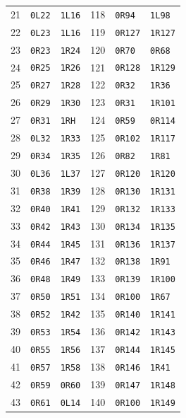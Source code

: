 \begin{longtable}{@{}rll@{\qquad\qquad}rll@{}}
21 & \texttt{0L22} & \texttt{1L16} & 118 & \texttt{0R94} & \texttt{1L98}\\
22 & \texttt{0L23} & \texttt{1L16} & 119 & \texttt{0R127} & \texttt{1R127}\\
23 & \texttt{0R23} & \texttt{1R24} & 120 & \texttt{0R70} & \texttt{0R68}\\
24 & \texttt{0R25} & \texttt{1R26} & 121 & \texttt{0R128} & \texttt{1R129}\\
25 & \texttt{0R27} & \texttt{1R28} & 122 & \texttt{0R32} & \texttt{1R36}\\
26 & \texttt{0R29} & \texttt{1R30} & 123 & \texttt{0R31} & \texttt{1R101}\\
27 & \texttt{0R31} & \texttt{1RH} & 124 & \texttt{0R59} & \texttt{0R114}\\
28 & \texttt{0L32} & \texttt{1R33} & 125 & \texttt{0R102} & \texttt{1R117}\\
29 & \texttt{0R34} & \texttt{1R35} & 126 & \texttt{0R82} & \texttt{1R81}\\
30 & \texttt{0L36} & \texttt{1L37} & 127 & \texttt{0R120} & \texttt{1R120}\\
31 & \texttt{0R38} & \texttt{1R39} & 128 & \texttt{0R130} & \texttt{1R131}\\
32 & \texttt{0R40} & \texttt{1R41} & 129 & \texttt{0R132} & \texttt{1R133}\\
33 & \texttt{0R42} & \texttt{1R43} & 130 & \texttt{0R134} & \texttt{1R135}\\
34 & \texttt{0R44} & \texttt{1R45} & 131 & \texttt{0R136} & \texttt{1R137}\\
35 & \texttt{0R46} & \texttt{1R47} & 132 & \texttt{0R138} & \texttt{1R91}\\
36 & \texttt{0R48} & \texttt{1R49} & 133 & \texttt{0R139} & \texttt{1R100}\\
37 & \texttt{0R50} & \texttt{1R51} & 134 & \texttt{0R100} & \texttt{1R67}\\
38 & \texttt{0R52} & \texttt{1R42} & 135 & \texttt{0R140} & \texttt{1R141}\\
39 & \texttt{0R53} & \texttt{1R54} & 136 & \texttt{0R142} & \texttt{1R143}\\
40 & \texttt{0R55} & \texttt{1R56} & 137 & \texttt{0R144} & \texttt{1R145}\\
41 & \texttt{0R57} & \texttt{1R58} & 138 & \texttt{0R146} & \texttt{1R41}\\
42 & \texttt{0R59} & \texttt{0R60} & 139 & \texttt{0R147} & \texttt{1R148}\\
43 & \texttt{0R61} & \texttt{0L14} & 140 & \texttt{0R100} & \texttt{1R149}\\

\end{longtable}
